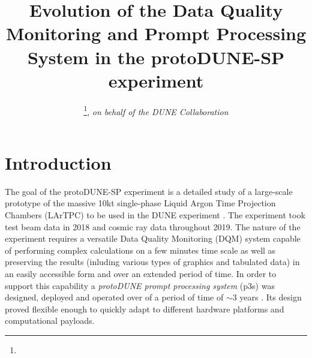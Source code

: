 \documentclass{webofc}
\newcommand{\pd}{protoDUNE\xspace}
\begin{document}
%
\title{Evolution of the Data Quality Monitoring and Prompt Processing System in the protoDUNE-SP experiment}


\author{
\fnsep\thanks{}, \it{on behalf of the DUNE Collaboration}
}



%
\maketitle
%
\section{Introduction}
\label{sec:intro}

The goal of the \pd-SP experiment  \cite{spanu} is a detailed study of a large-scale prototype
of the massive 10kt single-phase Liquid Argon Time Projection Chambers (LArTPC) to be used
in the DUNE experiment  \cite{cdrVol1, cdrVol4}. The experiment took test beam data in
2018 and cosmic ray data throughout 2019. The nature of the experiment requires a versatile
Data Quality Monitoring (DQM) system capable of performing complex calculations on
a few minutes time scale as well as preserving the results (inluding various types of graphics
and tabulated data) in an easily accessible form and over an extended period of time.
In order to support this capability a \textit{protoDUNE prompt processing system} (p3s)
was designed, deployed and operated over of a period of time of $\sim$3 years \cite{eps}. Its design proved flexible
enough to quickly adapt to different hardware platforms and computational payloads.
\end{document}
